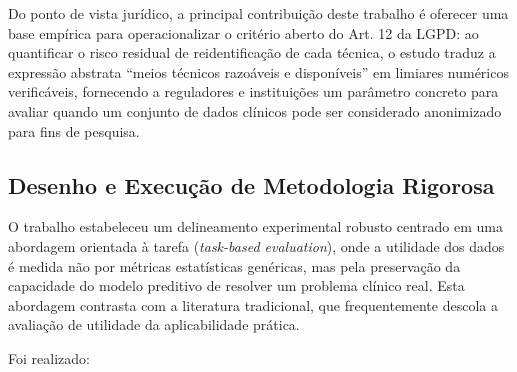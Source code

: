 Do ponto de vista jurídico, a principal contribuição deste trabalho é oferecer uma base empírica para operacionalizar o critério aberto do Art. 12 da LGPD: ao quantificar o risco residual de reidentificação de cada técnica, o estudo traduz a expressão abstrata ``meios técnicos razoáveis e disponíveis'' em limiares numéricos verificáveis, fornecendo a reguladores e instituições um parâmetro concreto para avaliar quando um conjunto de dados clínicos pode ser considerado anonimizado para fins de pesquisa.

\subsection{Desenho e Execução de Metodologia Rigorosa}

O trabalho estabeleceu um delineamento experimental robusto centrado em uma abordagem orientada à tarefa (\textit{task-based evaluation}), onde a utilidade dos dados é medida não por métricas estatísticas genéricas, mas pela preservação da capacidade do modelo preditivo de resolver um problema clínico real. Esta abordagem contrasta com a literatura tradicional, que frequentemente descola a avaliação de utilidade da aplicabilidade prática.

Foi realizado:

